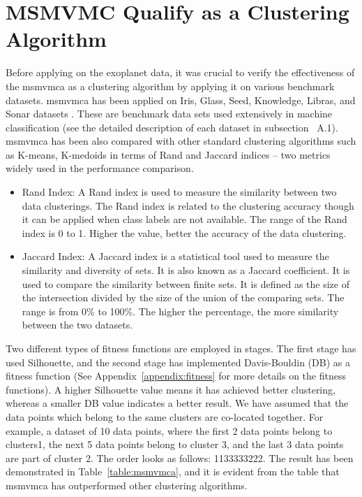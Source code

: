 \documentclass[fleqn,usenatbib]{mnras}
\begin{document}
 

\appendix


\section{MSMVMC Qualify as a Clustering Algorithm}\label{appen-msmvmca}

Before applying on the exoplanet data, it was crucial to verify the effectiveness of the \acrshort{msmvmca} as a clustering algorithm by applying it on various benchmark datasets. \acrshort{msmvmca} has been applied on Iris, Glass, Seed, Knowledge, Libras, and Sonar datasets \citep{iris}. These are benchmark data sets used extensively in machine classification (see the detailed description of each dataset in subsection~ A.1). \acrshort{msmvmca} has been also compared with other standard clustering algorithms such as K-means, K-medoids in terms of Rand and Jaccard indices -- two metrics widely used in the performance comparison.
\begin{itemize}
    \item Rand Index:
    A Rand index is used to measure the similarity between two data clusterings. The Rand index is related to the clustering accuracy though it can be applied when class labels are not available. The range of the Rand index is 0 to 1. Higher the value, better the accuracy of the data clustering.
    \item Jaccard Index: 
    A Jaccard index is a statistical tool used to measure the similarity and diversity of sets. It is also known as a Jaccard coefficient. It is used to compare the similarity between finite sets. It is defined as the size of the intersection divided by the size of the union of the comparing sets. The range is from 0\% to 100\%. The higher the percentage, the more similarity between the two datasets.
\end{itemize}
Two different types of fitness functions are employed in stages. The first stage has used Silhouette, and the second stage has implemented Davis-Bouldin (DB) as a fitness function (See Appendix~\ref{appendix:fitness} for more details on the fitness functions). A higher Silhouette value means it has achieved better clustering, whereas a smaller DB value indicates a better result. We have assumed that the data points which belong to the same clusters are co-located together. For example, a dataset of 10 data points, where the first 2 data points belong to clusters1, the next 5 data points belong to cluster 3, and the last 3 data points are part of cluster 2. The order looks as follows:  1133333222. The result has been demonstrated in Table~\ref{table:msmvmca}, and it is evident from the table that \acrshort{msmvmca} has outperformed other clustering algorithms.
\end{document}
